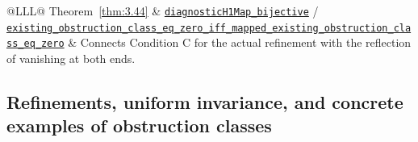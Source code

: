 \begin{xltabular}{\linewidth}{@{}LLL@{}}
\addlinespace[3pt]
Theorem~\ref{thm:3.44} & \href{https://github.com/iroha1203/AlgebraicArchitectureTheoryV2/blob/719f81f47d410701fd82c2bc88613cc140c59377/research/lean/ResearchLean/AG/ObstructionDiagnosticBridge/SelectedReadingConditionC.lean\#L450}{\texttt{diagnostic\allowbreak{}H1\allowbreak{}Map\_\allowbreak{}bijective}} / \href{https://github.com/iroha1203/AlgebraicArchitectureTheoryV2/blob/719f81f47d410701fd82c2bc88613cc140c59377/research/lean/ResearchLean/AG/ObstructionDiagnosticBridge/SelectedReadingConditionC.lean\#L476}{\texttt{existing\_\allowbreak{}obstruction\_\allowbreak{}class\_\allowbreak{}eq\_\allowbreak{}zero\_\allowbreak{}iff\_\allowbreak{}mapped\_\allowbreak{}existing\_\allowbreak{}obstruction\_\allowbreak{}class\_\allowbreak{}eq\_\allowbreak{}zero}} & Connects Condition C for the actual refinement with the reflection of vanishing at both ends. \\
\bottomrule
\end{xltabular}

\subsection*{Refinements, uniform invariance, and concrete examples of obstruction classes}

